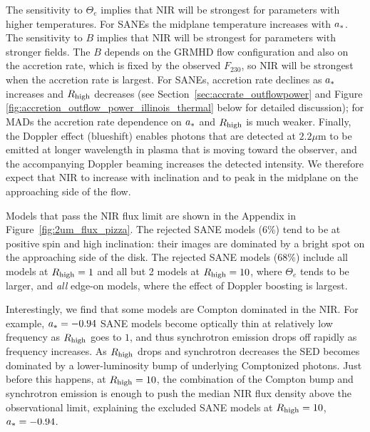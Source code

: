 The sensitivity to $\Theta_e$ implies that NIR will be strongest for parameters with higher temperatures.  For SANEs the midplane temperature increases with $a_*$.
The sensitivity to $B$ implies that NIR will be strongest for parameters with stronger fields.  The $B$ depends on the GRMHD flow configuration and also on the accretion rate, which is fixed by the observed $F_{230}$, so NIR will be strongest when the accretion rate is largest.  For SANEs, accretion rate declines as $a_*$ increases and $R_\mathrm{high}$ decreases (see Section~\ref{sec:accrate_outflowpower} and Figure \ref{fig:accretion_outflow_power_illinois_thermal} below for detailed discussion); for MADs the accretion rate dependence on $a_*$ and $R_\mathrm{high}$ is much weaker.
Finally, the Doppler effect (blueshift) enables photons that are detected at $2.2\mu$m to be emitted at longer wavelength in plasma that is moving toward the observer, and the accompanying Doppler beaming increases the detected intensity.  We therefore expect that NIR to increase with inclination and to peak in the midplane on the approaching side of the flow.

Models that pass the NIR flux limit are shown in the Appendix in Figure~\ref{fig:2um_flux_pizza}. The rejected SANE models ($6\%$) tend to be at positive spin and high inclination: their images are dominated by a bright spot on the approaching side of the disk.
The rejected SANE models ($68\%$) include all models at $R_\mathrm{high} = 1$ and all but 2 models at $R_\mathrm{high} = 10$, where $\Theta_e$ tends to be larger, and {\em all} edge-on models, where the effect of Doppler boosting is largest.

Interestingly, we find that some models are Compton dominated in the NIR.  For example, $a_* = -0.94$ SANE models become optically thin at relatively low frequency as $R_\mathrm{high}$ goes to $1$, and thus synchrotron emission drops off rapidly as frequency increases.
As $R_\mathrm{high}$ drops and synchrotron decreases the SED becomes dominated by a lower-luminosity bump of underlying Comptonized photons.  Just before this happens, at $R_\mathrm{high} = 10$, the combination of the Compton bump and synchrotron emission is enough to push the median NIR flux density above the observational limit, explaining the excluded SANE models at $R_\mathrm{high} = 10$, $a_* = -0.94$.


